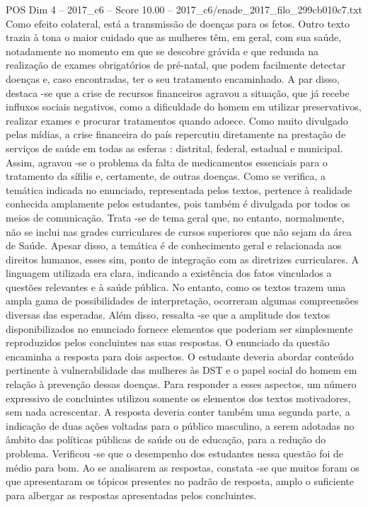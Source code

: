 \begin{textsample}{POS Dim 4 – 2017\_c6 – Score 10.00 – 2017\_c6/enade\_2017\_filo\_299cb010c7.txt}
Como efeito colateral, está a transmissão de doenças para os fetos.
Outro texto trazia à tona o maior cuidado que as mulheres têm, em geral, com sua saúde, notadamente no momento em que se descobre grávida e que redunda na realização de exames obrigatórios de pré-natal, que podem facilmente detectar doenças e, caso encontradas, ter o seu tratamento encaminhado.
A par disso, destaca -se que a crise de recursos financeiros agravou a situação, que já recebe influxos sociais negativos, como a dificuldade do homem em utilizar preservativos, realizar exames e procurar tratamentos quando adoece.
Como muito divulgado pelas mídias, a crise financeira do país repercutiu diretamente na prestação de serviços de saúde em todas as esferas : distrital, federal, estadual e municipal.
Assim, agravou -se o problema da falta de medicamentos essenciais para o tratamento da sífilis e, certamente, de outras doenças.
Como se verifica, a temática indicada no enunciado, representada pelos textos, pertence à realidade conhecida amplamente pelos estudantes, pois também é divulgada por todos os meios de comunicação.
Trata -se de tema geral que, no entanto, normalmente, não se inclui nas grades curriculares de cursos superiores que não sejam da área de Saúde.
Apesar disso, a temática é de conhecimento geral e relacionada aos direitos humanos, esses sim, ponto de integração com as diretrizes curriculares.
A linguagem utilizada era clara, indicando a existência dos fatos vinculados a questões relevantes e à saúde pública.
No entanto, como os textos trazem uma ampla gama de possibilidades de interpretação, ocorreram algumas compreensões diversas das esperadas.
Além disso, ressalta -se que a amplitude dos textos disponibilizados no enunciado fornece elementos que poderiam ser simplesmente reproduzidos pelos concluintes nas suas respostas.
O enunciado da questão encaminha a resposta para dois aspectos.
O estudante deveria abordar conteúdo pertinente à vulnerabilidade das mulheres às DST e o papel social do homem em relação à prevenção dessas doenças.
Para responder a esses aspectos, um número expressivo de concluintes utilizou somente os elementos dos textos motivadores, sem nada acrescentar.
A resposta deveria conter também uma segunda parte, a indicação de duas ações voltadas para o público masculino, a serem adotadas no âmbito das políticas públicas de saúde ou de educação, para a redução do problema.
Verificou -se que o desempenho dos estudantes nessa questão foi de médio para bom.
Ao se analisarem as respostas, constata -se que muitos foram os que apresentaram os tópicos presentes no padrão de resposta, amplo o suficiente para albergar as respostas apresentadas pelos concluintes.

\end{textsample}
